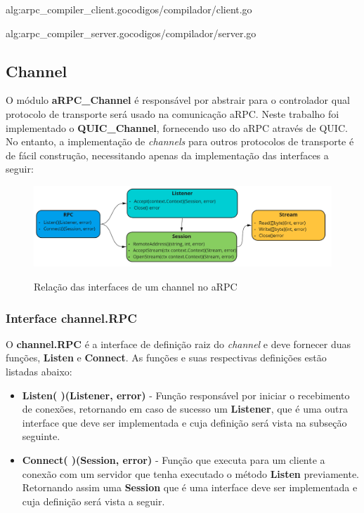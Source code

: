  {alg:arpc_compiler_client.go}{codigos/compilador/client.go}{}

 {alg:arpc_compiler_server.go}{codigos/compilador/server.go}{}

\subsection{Channel}

O módulo \textbf{aRPC\_Channel} é responsável por abstrair para o controlador qual protocolo de transporte será usado na comunicação aRPC. Neste trabalho foi implementado o \textbf{QUIC\_Channel}, fornecendo uso do aRPC através de QUIC. No entanto, a implementação de \textit{channels} para outros protocolos de transporte é de fácil construção, necessitando apenas da implementação das interfaces a seguir: 

\begin{figure}[ht]
    \centering
    \caption{Relação das interfaces de um channel no aRPC}
    \includegraphics[width=\textwidth]{figuras/diagramas/cap3/interfaces.png} 
    \label{fig:arpc_channel_interfaces}
\end{figure}

\subsubsection{Interface channel.RPC}

O \textbf{channel.RPC} é a interface de definição raiz do \textit{channel} e deve fornecer duas funções, \textbf{Listen} e \textbf{Connect}. As funções e suas respectivas definições estão listadas abaixo:

\begin{itemize}
	\item \textbf{Listen( )(Listener, error)} - Função responsável por iniciar o recebimento de conexões, retornando em caso de sucesso um \textbf{Listener}, que é uma outra interface que deve ser implementada e cuja definição será vista na subseção seguinte.
	\item \textbf{Connect( )(Session, error)} - Função que executa para um cliente a conexão com um servidor que tenha executado o método \textbf{Listen} previamente. Retornando assim uma \textbf{Session} que é uma interface deve ser implementada e cuja definição será vista a seguir.
\end{itemize}

